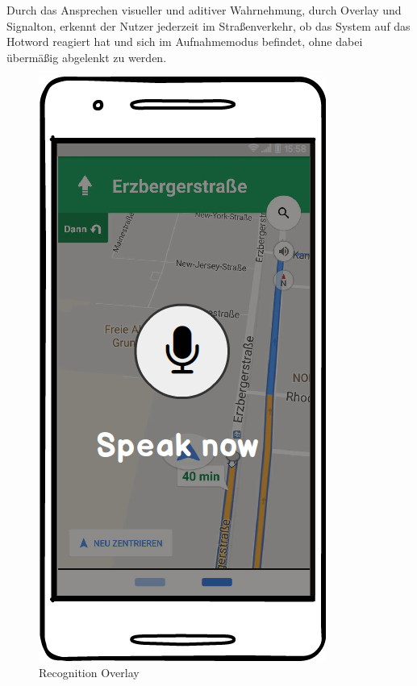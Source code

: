 Durch das Ansprechen visueller und aditiver Wahrnehmung, durch Overlay und Signalton, erkennt der Nutzer jederzeit im Straßenverkehr, ob das System auf das Hotword reagiert hat und sich im Aufnahmemodus befindet, ohne dabei übermäßig abgelenkt zu werden.  
\begin{figure}[h]
	\centering
  \includegraphics[scale=0.5]{images/voiceRecognition.png}
	\caption{Recognition Overlay}
	\label{figRecognition}
\end{figure}


